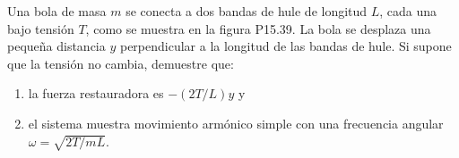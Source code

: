 \item Una bola de masa $m$ se conecta a dos bandas de hule de longitud $L$, cada una bajo tensión $T$, como se muestra en la figura P15.39. La bola se desplaza una pequeña distancia $y$ perpendicular a la longitud de las bandas de hule. Si supone que la tensión no cambia, demuestre que:
\begin{enumerate}
    \item la fuerza restauradora es $-(2T/L)y$ y
    \item el sistema muestra movimiento armónico simple con una frecuencia angular $\omega = \sqrt{2T/mL}$.
\end{enumerate}
